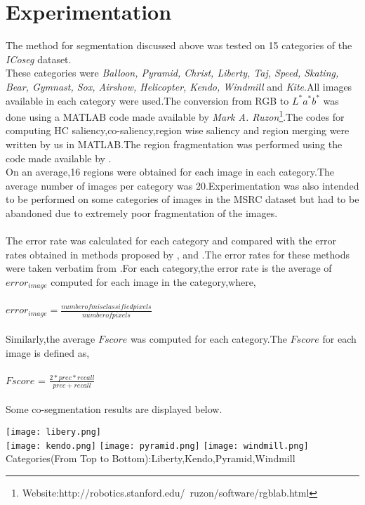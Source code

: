 \documentclass{article}
\begin{document}
\section{Experimentation}
The method for segmentation discussed above was tested on 15 categories of the \emph{ICoseg} dataset\cite{conf/cvpr/BatraKPLC10}.\\These categories were \emph{Balloon, Pyramid, Christ, Liberty, Taj, Speed, Skating, Bear, Gymnast, Sox, Airshow, Helicopter, Kendo, Windmill} and \emph{Kite}.All images available in each category were used.The conversion from RGB to $L^{*}a^{*}b^{*}$ was done using a MATLAB\textsuperscript{\textregistered} code made available by \emph{Mark A. Ruzon}\footnote{Website:http://robotics.stanford.edu/~ruzon/software/rgblab.html}.The codes for computing HC saliency,co-saliency,region wise saliency and region merging were written by us in MATLAB\textsuperscript{\textregistered}.The region fragmentation was performed using the code made available by \cite{Felzenszwalb:2004:EGI:981793.981796}.\\On an average,16 regions were obtained for each image in each category.The average number of images per category was 20.Experimentation was also intended to be performed on some categories of images in the MSRC dataset but had to be abandoned due to extremely poor fragmentation of the images.\\\\
The error rate was calculated for each category and compared with the error rates obtained in methods proposed by \cite{conf/cvpr/JoulinBP10},\cite{Vicente:2011:OC:2191740.2191840} and \cite{GunheeKim:2011:DCV:2355573.2356257}.The error rates for these methods were taken verbatim from \cite{6194335}.For each category,the error rate is the average of $error_{image}$ computed for each image in the category,where,\\\\
\hspace*{3 cm}$error_{image}=\frac{number of misclassified pixels}{number of pixels}$\\\\Similarly,the average $F score$ was computed for each category.The $F score$ for each image is defined as,\\\\
\hspace*{3 cm}$F score$ = $\frac{2*prec*recall}{prec+recall}$\\\\
Some co-segmentation results are displayed below.\\
\begin{center}
\texttt{[image: libery.png]}\\
\texttt{[image: kendo.png]}
\texttt{[image: pyramid.png]}
\texttt{[image: windmill.png]}\\
Categories(From Top to Bottom):Liberty,Kendo,Pyramid,Windmill
\end{center}
\end{document}
